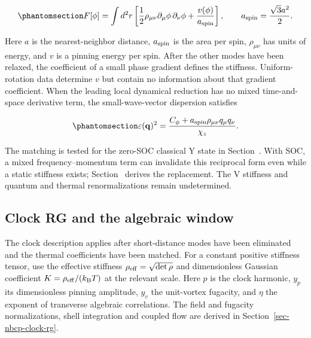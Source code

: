 \begin{equation}\phantomsection\label{eq-nbcp-continuum-energy}{
F[\phi]=\int d^2r\left[
\frac12\rho_{\mu\nu}\partial_\mu\phi\,\partial_\nu\phi
+\frac{v(\phi)}{a_{\rm spin}}\right],
\qquad a_{\rm spin}=\frac{\sqrt3a^2}{2}.
}\end{equation}

Here \(a\) is the nearest-neighbor distance, \(a_{\rm spin}\) is the
area per spin, \(\rho_{\mu\nu}\) has units of energy, and \(v\) is a
pinning energy per spin. After the other modes have been relaxed, the
coefficient of a small phase gradient defines the stiffness.
Uniform-rotation data determine \(v\) but contain no information about
that gradient coefficient. When the leading local dynamical reduction
has no mixed time-and-space derivative term, the small-wave-vector
dispersion satisfies

\begin{equation}\phantomsection\label{eq-nbcp-phase-dispersion}{
\varepsilon(\mathbf q)^2=
\frac{C_\phi+a_{\rm spin}\rho_{\mu\nu}q_\mu q_\nu}{\chi_z}.
}\end{equation}

The matching is tested for the zero-SOC classical Y state in
Section~. With SOC, a mixed
frequency--momentum term can invalidate this reciprocal form even while
a static stiffness exists; Section~
derives the replacement. The V stiffness and quantum and thermal
renormalizations remain undetermined.

\subsection{Clock RG and the algebraic window}\label{sec-nbcp-clock}

The clock description applies after short-distance modes have been
eliminated and the thermal coefficients have been matched. For a
constant positive stiffness tensor, use the effective stiffness
\(\rho_{\rm eff}=\sqrt{\det\rho}\) and dimensionless Gaussian
coefficient \(K=\rho_{\rm eff}/(k_{\rm B}T)\) at the relevant scale.
Here \(p\) is the clock harmonic, \(y_p\) its dimensionless pinning
amplitude, \(y_v\) the unit-vortex fugacity, and \(\eta\) the exponent
of transverse algebraic correlations. The field and fugacity
normalizations, shell integration and coupled flow are derived in
Section~\ref{sec-nbcp-clock-rg}.

